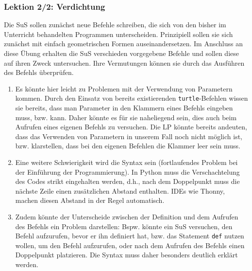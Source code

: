 \begin{myExBox}[title=DL \themycounter]
\subsubsection*{Lektion 2/2: Verdichtung}
Die SuS sollen zunächst neue Befehle schreiben, die sich von den bisher im Unterricht behandelten Programmen unterscheiden. Prinzipiell sollen sie sich zunächst mit einfach geometrischen Formen auseinandersetzen. Im Anschluss an diese Übung erhalten die SuS verschieden vorgegebene Befehle und sollen diese auf ihren Zweck untersuchen. Ihre Vermutungen können sie durch das Ausführen des Befehls überprüfen.

\begin{myExBox}[title=Mögliche Schwierigkeiten \& geeignete Massnahmen]
\begin{enumerate}
    \item Es könnte hier leicht zu Problemen mit der Verwendung von Parametern kommen. Durch den Einsatz von bereits existierenden \lstinline|turtle|-Befehlen wissen sie bereits, dass man Parameter in den Klammern eines Befehls eingeben muss, bzw. kann. Daher könnte es für sie naheliegend sein, dies auch beim Aufrufen eines eigenen Befehls zu versuchen. Die LP könnte bereits andeuten, dass das Verwenden von Parametern in unserem Fall noch nicht möglich ist, bzw. klarstellen, dass bei den eigenen Befehlen die Klammer leer sein muss.
    \item Eine weitere Schwierigkeit wird die Syntax sein (fortlaufendes Problem bei der Einführung der Programmierung). In Python muss die Verschachtelung des Codes strikt eingehalten werden, d.h., nach dem Doppelpunkt muss die nächste Zeile einen zusätzlichen Abstand enthalten. IDEs wie Thonny, machen diesen Abstand in der Regel automatisch.
    \item Zudem könnte der Unterscheide zwischen der Definition und dem Aufrufen des Befehls ein Problem darstellen: Bspw. könnte ein SuS versuchen, den Befehl aufzurufen, bevor er ihn definiert hat, bzw. das Statement \lstinline|def| nutzen wollen, um den Befehl aufzurufen, oder nach dem Aufrufen des Befehls einen Doppelpunkt platzieren. Die Syntax muss daher besonders deutlich erklärt werden. 
\end{enumerate}
\end{myExBox}
\end{myExBox}
\newpage{}

